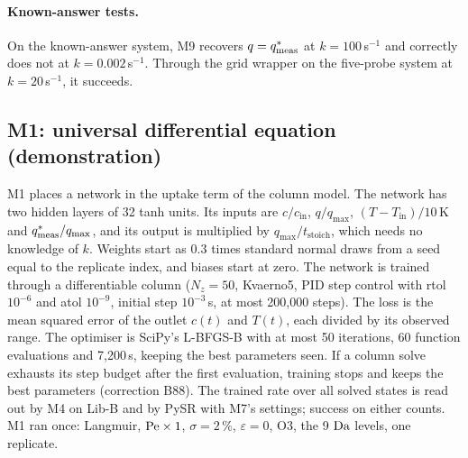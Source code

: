 \paragraph{Known-answer tests.} On the known-answer system, M9 recovers $q = q^{*}_{\mathrm{meas}}$ at
$k = 100$\,s$^{-1}$ and correctly does not at $k = 0.002$\,s$^{-1}$. Through the grid wrapper
on the five-probe system at $k = 20$\,s$^{-1}$, it succeeds.

\subsection*{M1: universal differential equation (demonstration)}
M1 places a network in the uptake term of the column model. The network has two hidden layers
of 32 tanh units. Its inputs are $c/c_{\mathrm{in}}$, $q/q_{\max}$, $(T - T_{\mathrm{in}})/10$\,K
and $q^{*}_{\mathrm{meas}}/q_{\max}$, and its output is multiplied by $q_{\max}/t_{\mathrm{stoich}}$, which needs
no knowledge of $k$. Weights start as $0.3$ times standard normal draws from a seed equal to
the replicate index, and biases start at zero. The network is trained through a
differentiable column ($N_z = 50$, Kvaerno5, PID step control with rtol $10^{-6}$ and atol
$10^{-9}$, initial step $10^{-3}$\,s, at most 200,000 steps). The loss is the mean squared
error of the outlet $c(t)$ and $T(t)$, each divided by its observed range. The optimiser is
SciPy's L-BFGS-B with at most 50 iterations, 60 function evaluations and 7,200\,s, keeping the
best parameters seen. If a column solve exhausts its step budget after the first evaluation,
training stops and keeps the best parameters (correction B88). The trained rate over all
solved states is read out by M4 on Lib-B and by PySR with M7's settings; success on either
counts. M1 ran once: Langmuir, $\mathrm{Pe} \times 1$, $\sigma = 2\,\%$, $\varepsilon = 0$, O3, the 9
$\mathrm{Da}$ levels, one replicate.

